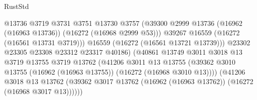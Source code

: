 \begin{lexlean}{RustStd}
\begin{coremodule}
                                              @13736
                                              @3719
                                              @3731
                                              @3751
                                              @13730
                                              @3757
                                              (@39300
                                                @2999
                                                @13736
                                                (@16962 (@16963 @13736))
                                                (@16272 (@16968 @2999 @53)))
                                              @39267
                                              @16559
                                              (@16272 (@16561 @13731 @3719)))
                                            @16559
                                            (@16272 (@16561 @13721 @13739)))
                                          @23302
                                          @23305
                                          @23308
                                          @23312
                                          @23317
                                          @40186)
                                        (@40861
                                          @13749
                                          @3011
                                          @3018
                                          @13
                                          @3719
                                          @13755
                                          @3719
                                          @13762
                                          (@41206
                                            @3011
                                            @13
                                            @13755
                                            (@39362
                                              @3010
                                              @13755
                                              (@16962 (@16963 @13755))
                                              (@16272 (@16968 @3010 @13))))
                                          (@41206
                                            @3018
                                            @13
                                            @13762
                                            (@39362
                                              @3017
                                              @13762
                                              (@16962 (@16963 @13762))
                                              (@16272 (@16968 @3017 @13))))))

\end{coremodule}
\end{lexlean}
